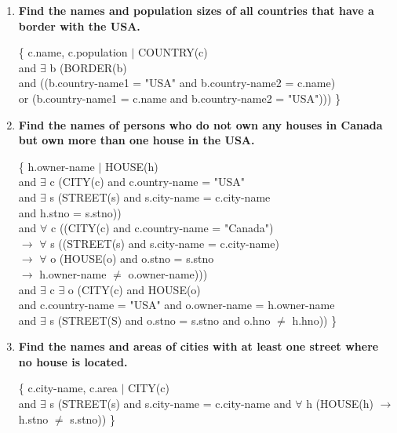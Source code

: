 \documentclass[11pt]{article}
\begin{document}
\begin{enumerate}
\begin{enumerate}
	\item \textbf{Find the names and population sizes of all countries that have a border with the USA.}
	
	\{ c.name, c.population $\vert$ COUNTRY(c) \\
	and $\exists$ b (BORDER(b) \\
	and ((b.country-name1 = "USA" and b.country-name2 = c.name) \\
	or (b.country-name1 = c.name and b.country-name2 = "USA"))) \}
	
	\item \textbf{Find the names of persons who do not own any houses in Canada but own more than one house in the USA.}
	
	\{ h.owner-name $\vert$ HOUSE(h) \\
	and $\exists$ c (CITY(c) and c.ountry-name = "USA" \\
	and $\exists$ s (STREET(s) and s.city-name = c.city-name \\
	and h.stno = s.stno)) \\
	
	and $\forall$ c ((CITY(c) and c.country-name = "Canada") \\
	$\rightarrow$ $\forall$ s ((STREET(s) and s.city-name = c.city-name) \\
	$\rightarrow$ $\forall$ o (HOUSE(o) and o.stno = s.stno \\
	$\rightarrow$ h.owner-name $\neq$ o.owner-name))) \\

	and $\exists$ c $\exists$ o (CITY(c) and HOUSE(o) \\
	and c.country-name = "USA" and o.owner-name = h.owner-name \\
	and $\exists$ s (STREET(S) and o.stno = s.stno and o.hno $\neq$ h.hno)) \}

	\item \textbf{Find the names and areas of cities with at least one street where no house is located.}

	\{ c.city-name, c.area $\vert$ CITY(c) \\
	and $\exists$ s (STREET(s) and s.city-name = c.city-name
	and $\forall$ h (HOUSE(h) $\rightarrow$ h.stno $\neq$ s.stno)) \}
\end{enumerate}

\end{enumerate}
\end{document}
